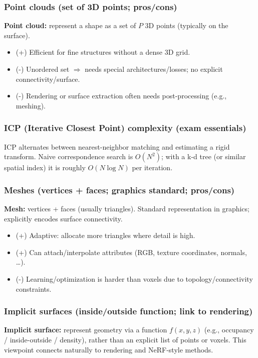 \documentclass[11pt,a4paper]{article}
\begin{document}
\subsubsection{Point clouds (set of 3D points; pros/cons)}
\begin{defbox}
\textbf{Point cloud:} represent a shape as a set of $P$ 3D points (typically on the surface).
\end{defbox}
\begin{itemize}
  \item (+) Efficient for fine structures without a dense 3D grid.
  \item (-) Unordered set $\Rightarrow$ needs special architectures/losses; no explicit connectivity/surface.
  \item (-) Rendering or surface extraction often needs post-processing (e.g., meshing).
\end{itemize}

\subsubsection{ICP (Iterative Closest Point) complexity (exam essentials)}
\begin{notebox}
ICP alternates between nearest-neighbor matching and estimating a rigid transform.
Naive correspondence search is $O(N^2)$; with a k-d tree (or similar spatial index) it is roughly $O(N\log N)$ per iteration.
\end{notebox}

\subsubsection{Meshes (vertices + faces; graphics standard; pros/cons)}
\begin{defbox}
\textbf{Mesh:} vertices + faces (usually triangles). Standard representation in graphics; explicitly encodes surface connectivity.
\end{defbox}
\begin{itemize}
  \item (+) Adaptive: allocate more triangles where detail is high.
  \item (+) Can attach/interpolate attributes (RGB, texture coordinates, normals, \dots).
  \item (-) Learning/optimization is harder than voxels due to topology/connectivity constraints.
\end{itemize}

\subsubsection{Implicit surfaces (inside/outside function; link to rendering)}
\begin{defbox}
\textbf{Implicit surface:} represent geometry via a function $f(x,y,z)$ (e.g., occupancy / inside-outside / density),
rather than an explicit list of points or voxels. This viewpoint connects naturally to rendering and NeRF-style methods.
\end{defbox}
\end{document}
